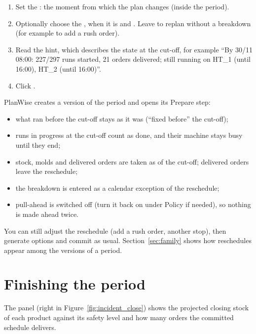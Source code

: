 \begin{steps}
\begin{enumerate}
  \item Set the : the moment from which the plan changes (inside the period).
  \item Optionally choose the , when it is  and . Leave
         to replan without a breakdown (for example to add a rush order).
  \item Read the hint, which describes the state at the cut-off, for example ``By 30/11 08:00: 227/297 runs
        started, 21 orders delivered; still running on HT\_1 (until 16:00), HT\_2 (until 16:00)''.
  \item Click .
\end{enumerate}
\end{steps}

PlanWise creates a  version of the period and opens its Prepare step:

\begin{itemize}
  \item what ran before the cut-off stays as it was (``fixed before'' the cut-off);
  \item runs in progress at the cut-off count as done, and their machine stays busy until they end;
  \item stock, molds and delivered orders are taken as of the cut-off; delivered orders leave the reschedule;
  \item the breakdown is entered as a calendar exception of the reschedule;
  \item pull-ahead is switched off (turn it back on under Policy if needed), so nothing is made ahead twice.
\end{itemize}

You can still adjust the reschedule (add a rush order, another stop), then generate options and commit as
usual. Section~\ref{sec:family} shows how reschedules appear among the versions of a period.

\section{Finishing the period}\label{sec:close}

The  panel (right in Figure~\ref{fig:incident_close}) shows the projected closing stock
of each product against its safety level and how many orders the committed schedule delivers.

